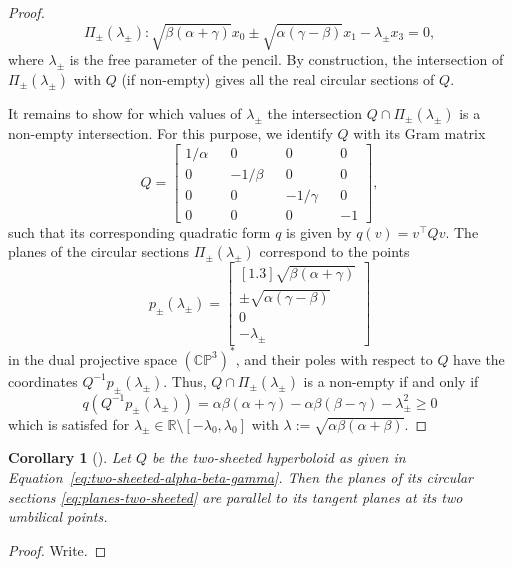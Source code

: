 \documentclass[10pt, a4paper]{article}
\theoremstyle{BoldTopSpacing}
\theoremstyle{BoldTopSpacing}
\theoremstyle{BoldTopSpacing}
\newtheorem{corollary}{Corollary}[theorem]
\theoremstyle{BoldTopBottomSpacing}
\theoremstyle{BoldTopSpacing}
\theoremstyle{BoldTopBottomSpacing}
\theoremstyle{remark}
\begin{document}
\begin{proof}
\[
    \Pi_{\pm}(\lambda_{\pm}) : \sqrt{\beta (\alpha + \gamma)} x_{0} \pm \sqrt{\alpha (\gamma - \beta)} x_{1} - \lambda_{\pm} x_{3} = 0,
\]
where $\lambda_{\pm}$ is the free parameter of the pencil. By construction, the intersection of $\Pi_{\pm}(\lambda_{\pm})$ with $Q$ (if non-empty) gives all the real circular sections of $Q$. \par
It remains to show for which values of $\lambda_{\pm}$ the intersection $Q \cap \Pi_{\pm}(\lambda_{\pm})$ is a non-empty intersection. For this purpose, we identify $Q$ with its Gram matrix
\[
Q =
\begin{bmatrix}
1 / \alpha && 0 && 0 && 0 \\
0 && -1 / \beta && 0 && 0 \\
0 && 0 && -1 / \gamma && 0 \\
0 && 0 && 0 && -1
\end{bmatrix},
\]
such that its corresponding quadratic form $q$ is given by $q(v) = v^{\top} Q v$. The planes of the circular sections $\Pi_{\pm}(\lambda_{\pm})$ correspond to the points
\[
p_{\pm}({\lambda_{\pm}}) =
\begin{bmatrix}[1.3]
\sqrt{\beta (\alpha + \gamma)}\\
\pm \sqrt{\alpha (\gamma - \beta)}\\
0\\
-\lambda_{\pm}
\end{bmatrix}
\]
in the dual projective space $(\mathbb{C}\mathbb{P}^3)^{*}$, and their poles with respect to $Q$ have the coordinates $Q^{-1}p_{\pm}({\lambda_{\pm}})$. Thus, $Q \cap \Pi_{\pm}(\lambda_{\pm})$ is a non-empty if and only if
\[
    q(Q^{-1}p_{\pm}({\lambda_{\pm}})) = \alpha \beta (\alpha + \gamma) - \alpha \beta (\beta - \gamma) - \lambda_{\pm}^2 \geq 0
\]
which is satisfed for $\lambda_{\pm} \in \mathbb{R} \setminus \left[-\lambda_0, \lambda_0\right]$ with $\lambda := \sqrt{\alpha \beta (\alpha+\beta)}$.
\end{proof}

\begin{corollary}[]
\label{col:planes-parallel-umbilic-points}
Let $Q$ be the two-sheeted hyperboloid as given in Equation~\eqref{eq:two-sheeted-alpha-beta-gamma}. Then the planes of its circular sections \eqref{eq:planes-two-sheeted} are parallel to its tangent planes at its two umbilical points.
\end{corollary}

\begin{proof}
    Write.
\end{proof}
\end{document}
